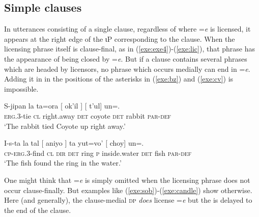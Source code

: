 \documentclass[output=paper,
modfonts
]{LSP/langsci}
\begin{document}
\subsection{Simple clauses}
In utterances consisting of a single clause, regardless of where =\emph{e} is licensed,
it appears at the right edge of the ιP corresponding to the clause.
When the licensing phrase itself is clause-final, as in (\ref{exe:exe4})-(\ref{exe:lic}), that phrase has the appearance 
of being closed by =\emph{e}. 
But if a clause contains several phrases which are headed by licensors, no phrase which occurs medially can end in 
=\emph{e}. Adding it in in the positions of the asterisks in (\ref{exe:bz}) and (\ref{exe:cv}) is impossible.
		\begin{exe}
		\ex\label{exe:bz}\bridgeoverex
		\gll S-jipan la ta=ora [ ok'il ] [ t'ul] un=.\\
		\textsc{erg.3}-tie \textsc{cl} right.away \textsc{det} coyote {} \textsc{det} rabbit  \textsc{par-def} \\
		\glt `The rabbit tied Coyote up right away.'  \citep[160]{laughlin1977} 
		\end{exe}
		\begin{exe}
		\ex\label{exe:cv}\bridgeoverex
		\gll I-s-ta la tal [ aniyo ]  ta yut=vo' [ choy] un=\tikzmarkfullnamed{h}{e}. \\
		\textsc{cp-erg.3}-find \textsc{cl} \textsc{dir} \textsc{det} ring {}  \textsc{p} inside.water \textsc{det} fish \textsc{par-def} \\
		\glt `The fish found the ring in the water.'   \citep[354]{laughlin1977} 
		\bridgeover{e}{f}
		\bridgeover{g}{h}
		\end{exe}
One might think that =\emph{e} is simply omitted when the licensing phrase does not occur clause-finally. But examples like (\ref{exe:sob})-(\ref{exe:candle}) 
show otherwise.  Here (and generally), the clause-medial \textsc{dp} \emph{does} license =\emph{e}  but the  
is delayed to the end of the clause.
\end{document}
